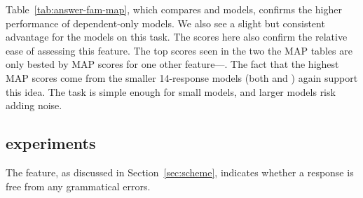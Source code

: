 Table~\ref{tab:answer-fam-map}, which compares  and  models, confirms the higher performance of dependent-only models. We also see a slight but consistent advantage for the  models on this task.
The scores here also confirm the relative ease of assessing this feature. The top scores seen in the two the  MAP tables are only bested by MAP scores for one other feature---. The fact that the highest  MAP scores come from the smaller 14-response models (both  and ) again support this idea. The task is simple enough for small models, and larger models risk adding noise.


\subsection{ experiments}
\label{sec:map-gramm}

The  feature, as discussed in Section~\ref{sec:scheme}, indicates whether a response is free from any grammatical errors. 

